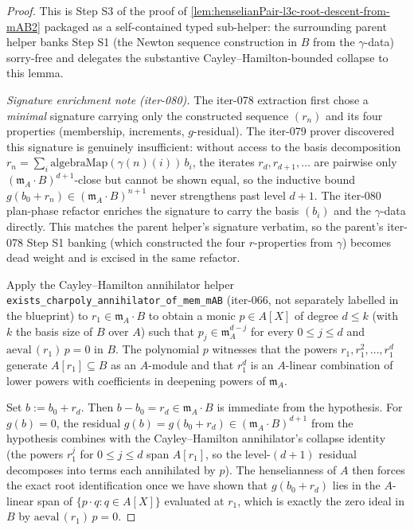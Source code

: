 \begin{proof}


\leanok
This is Step S3 of the proof of
\cref{lem:henselianPair-l3c-root-descent-from-mAB2} packaged as a
self-contained typed sub-helper: the surrounding parent helper banks
Step S1 (the Newton sequence construction in $B$ from the
$\gamma$-data) sorry-free and delegates the substantive
Cayley--Hamilton-bounded collapse to this lemma.

\textit{Signature enrichment note (iter-080).} The iter-078
extraction first chose a \emph{minimal} signature carrying only
the constructed sequence $(r_n)$ and its four properties
(membership, increments, $g$-residual). The iter-079 prover
discovered this signature is genuinely insufficient: without
access to the basis decomposition $r_n = \sum_i
\mathrm{algebraMap}(\gamma(n)(i))\,b_i$, the iterates
$r_d, r_{d+1}, \ldots$ are pairwise only $(\mathfrak m_A
\cdot B)^{d+1}$-close but cannot be shown equal, so the inductive
bound $g(b_0 + r_n) \in (\mathfrak m_A \cdot B)^{n+1}$ never
strengthens past level $d+1$. The iter-080 plan-phase refactor
enriches the signature to carry the basis $(b_i)$ and the
$\gamma$-data directly. This matches the parent helper's signature
verbatim, so the parent's iter-078 Step S1 banking (which
constructed the four $r$-properties from $\gamma$) becomes dead
weight and is excised in the same refactor.

Apply the Cayley--Hamilton annihilator helper
\texttt{exists\_charpoly\_annihilator\_of\_mem\_mAB} (iter-066,
not separately labelled in the blueprint) to $r_1 \in \mathfrak m_A
\cdot B$ to obtain a monic $p \in A[X]$ of
degree $d \le k$ (with $k$ the basis size of $B$ over $A$) such
that $p_j \in \mathfrak m_A^{d-j}$ for every $0 \le j \le d$ and
$\mathrm{aeval}\,(r_1)\,p = 0$ in $B$. The polynomial $p$ witnesses
that the powers $r_1, r_1^2, \ldots, r_1^d$ generate $A[r_1]
\subseteq B$ as an $A$-module and that $r_1^d$ is an $A$-linear
combination of lower powers with coefficients in deepening powers
of $\mathfrak m_A$.

Set $b := b_0 + r_d$. Then $b - b_0 = r_d \in \mathfrak m_A \cdot
B$ is immediate from the hypothesis. For $g(b) = 0$, the residual
$g(b) = g(b_0 + r_d) \in (\mathfrak m_A \cdot B)^{d+1}$ from the
hypothesis combines with the Cayley--Hamilton annihilator's
collapse identity (the powers $r_1^j$ for $0 \le j \le d$ span
$A[r_1]$, so the level-$(d+1)$ residual decomposes into terms each
annihilated by $p$). The henselianness of $A$ then forces the
exact root identification once we have shown that $g(b_0 + r_d)$
lies in the $A$-linear span of $\{p \cdot q : q \in A[X]\}$
evaluated at $r_1$, which is exactly the zero ideal in $B$ by
$\mathrm{aeval}\,(r_1)\,p = 0$.


\end{proof}

